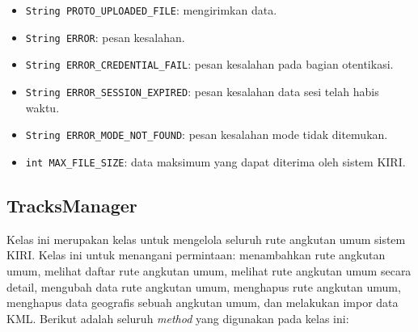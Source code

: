 \begin{itemize}
	\item \texttt{String PROTO\_UPLOADED\_FILE}: mengirimkan data.
	\item \texttt{String ERROR}: pesan kesalahan.
	\item \texttt{String ERROR\_CREDENTIAL\_FAIL}: pesan kesalahan pada bagian otentikasi.
	\item \texttt{String ERROR\_SESSION\_EXPIRED}: pesan kesalahan data sesi telah habis waktu.
	\item \texttt{String ERROR\_MODE\_NOT\_FOUND}: pesan kesalahan mode tidak ditemukan.
	\item \texttt{int MAX\_FILE\_SIZE}: data maksimum yang dapat diterima oleh sistem KIRI.
\end{itemize}

\subsection{TracksManager}
\label{sec:tracksmanager}
Kelas ini merupakan kelas untuk mengelola seluruh rute angkutan umum sistem KIRI. Kelas ini untuk menangani permintaan: menambahkan rute angkutan umum, melihat daftar rute angkutan umum, melihat rute angkutan umum secara detail, mengubah data rute angkutan umum, menghapus rute angkutan umum, menghapus data geografis sebuah angkutan umum, dan melakukan impor data KML. Berikut adalah seluruh \textit{method} yang digunakan pada kelas ini:
